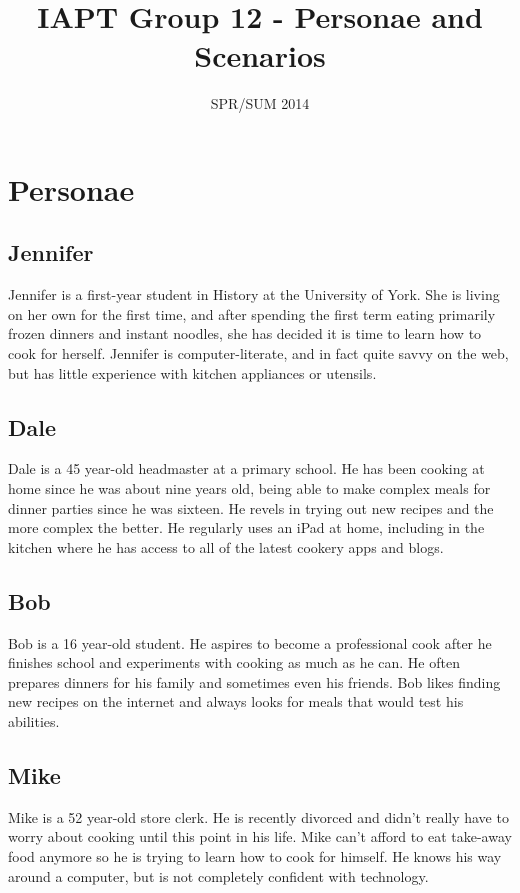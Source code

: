 \documentclass{article}
\title{IAPT Group 12 - Personae and Scenarios}
\date{SPR/SUM 2014}
\begin{document}
\maketitle
\clearpage

\section*{Personae}
\subsection*{Jennifer}
Jennifer is a first-year student in History at the University of York. She is 
living on her own for the first time, and after spending the first term eating
primarily frozen dinners and instant noodles, she has decided it is time to 
learn how to cook for herself. Jennifer is computer-literate, and in fact quite
savvy on the web, but has little experience with kitchen appliances or utensils.

\subsection*{Dale}
Dale is a 45 year-old headmaster at a primary school. He has been cooking at home
since he was about nine years old, being able to make complex meals for dinner
parties since he was sixteen. He revels in trying out new recipes and the more
complex the better. He regularly uses an iPad at home, including in the kitchen
where he has access to all of the latest cookery apps and blogs.

\subsection*{Bob}
Bob is a 16 year-old student. He aspires to become a professional cook after he 
finishes school and experiments with cooking as much as he can. He often prepares
dinners for his family and sometimes even his friends. Bob likes finding new
recipes on the internet and always looks for meals that would test his abilities.

\subsection*{Mike}
Mike is a 52 year-old store clerk. He is recently divorced and didn't really have
to worry about cooking until this point in his life. Mike can't afford to eat
take-away food anymore so he is trying to learn how to cook for himself. He knows
his way around a computer, but is not completely confident with technology.
\end{document}
